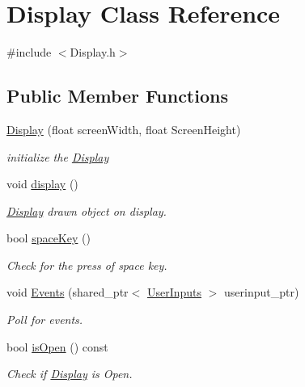 \hypertarget{class_display}{}\section{Display Class Reference}
\label{class_display}


{\ttfamily \#include $<$Display.\+h$>$}

\subsection*{Public Member Functions}
\begin{DoxyCompactItemize}
\item 
\mbox{\label{class_display_aeb2f7390982338b48d8bb9a61f159bc3}} 
\mbox{\hyperlink{class_display_aeb2f7390982338b48d8bb9a61f159bc3}{Display}} (float screen\+Width, float Screen\+Height)
\begin{DoxyCompactList}\small\item\em initialize the \mbox{\hyperlink{class_display}{Display}} \end{DoxyCompactList}\item 
\mbox{\label{class_display_aa3ab70ec7b76fa3ed139d19e53e72283}} 
void \mbox{\hyperlink{class_display_aa3ab70ec7b76fa3ed139d19e53e72283}{display}} ()
\begin{DoxyCompactList}\small\item\em \mbox{\hyperlink{class_display}{Display}} drawn object on display. \end{DoxyCompactList}\item 
bool \mbox{\hyperlink{class_display_a2d8a021131e48ba0388c24754dd5286c}{space\+Key}} ()
\begin{DoxyCompactList}\small\item\em Check for the press of space key. \end{DoxyCompactList}\item 
void \mbox{\hyperlink{class_display_afd34049cad61f21d56f8d64c53282cea}{Events}} (shared\+\_\+ptr$<$ \mbox{\hyperlink{class_user_inputs}{User\+Inputs}} $>$ userinput\+\_\+ptr)
\begin{DoxyCompactList}\small\item\em Poll for events. \end{DoxyCompactList}\item 
bool \mbox{\hyperlink{class_display_a45a76d7780b8b35251a4510849cd58e8}{is\+Open}} () const
\begin{DoxyCompactList}\small\item\em Check if \mbox{\hyperlink{class_display}{Display}} is Open. \end{DoxyCompactList}\item 

\end{DoxyCompactItemize}
